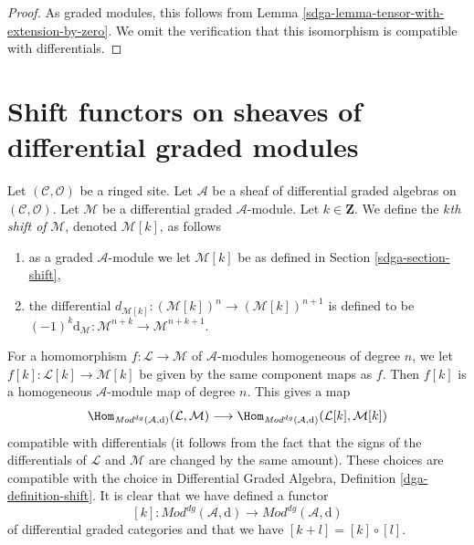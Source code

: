 \begin{proof}

As graded modules, this follows from
Lemma \ref{sdga-lemma-tensor-with-extension-by-zero}.
We omit the verification that this isomorphism
is compatible with differentials.
\end{proof}

\section{Shift functors on sheaves of differential graded modules}
\label{sdga-section-shift-dg}
Let $(\mathcal{C}, \mathcal{O})$ be a ringed site.
Let $\mathcal{A}$ be a sheaf of differential graded algebras
on $(\mathcal{C}, \mathcal{O})$.
Let $\mathcal{M}$ be a differential graded $\mathcal{A}$-module.
Let $k \in \mathbf{Z}$. We define the {\it $k$th shift of} $\mathcal{M}$,
denoted $\mathcal{M}[k]$, as follows
\begin{enumerate}
\item as a graded $\mathcal{A}$-module we let $\mathcal{M}[k]$ be
as defined in Section \ref{sdga-section-shift},
\item the differential
$d_{\mathcal{M}[k]} : (\mathcal{M}[k])^n \to (\mathcal{M}[k])^{n + 1}$
is defined to be
$(-1)^k\text{d}_\mathcal{M} : \mathcal{M}^{n + k} \to \mathcal{M}^{n + k + 1}$.
\end{enumerate}
For a homomorphism $f : \mathcal{L} \to \mathcal{M}$ of $\mathcal{A}$-modules
homogeneous of degree $n$, we let $f[k] : \mathcal{L}[k] \to \mathcal{M}[k]$
be given by the same component maps as $f$. Then $f[k]$ is
a homogeneous $\mathcal{A}$-module map of degree $n$.
This gives a map
$$
\Hom_{\textit{Mod}^{dg}(\mathcal{A}, \text{d})}(\mathcal{L}, \mathcal{M})
\longrightarrow
\Hom_{\textit{Mod}^{dg}(\mathcal{A}, \text{d})}
(\mathcal{L}[k], \mathcal{M}[k])
$$
compatible with differentials (it follows from the fact
that the signs of the differentials of $\mathcal{L}$ and
$\mathcal{M}$ are changed by the same amount). These choices are
compatible with the choice in
Differential Graded Algebra, Definition \ref{dga-definition-shift}.
It is clear that we have defined a functor
$$
[k] :
\textit{Mod}^{dg}(\mathcal{A}, \text{d})
\longrightarrow
\textit{Mod}^{dg}(\mathcal{A}, \text{d})
$$
of differential graded categories and that we have
$[k + l] = [k] \circ [l]$.

